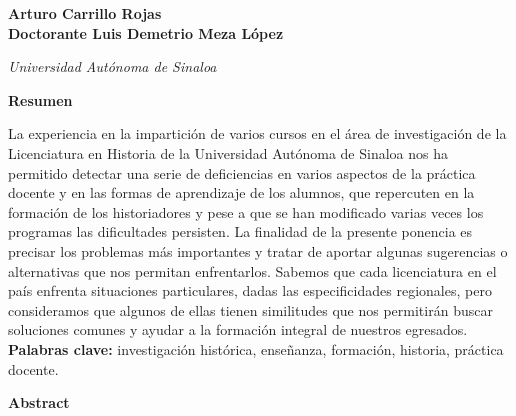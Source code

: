 %

\thispagestyle{empty}
{\par}
\setcounter{footnote}{0}


\bigskip
\begin{center}
{\bfseries Arturo Carrillo Rojas \\
Doctorante Luis Demetrio Meza López}\\
{\itshape Universidad Autónoma de Sinaloa \par}
\end{center}

\bigskip
{\bfseries Resumen}

La experiencia en la impartición de varios cursos en el área de 
investigación de la Licenciatura en Historia de la Universidad Autónoma 
de Sinaloa nos ha permitido detectar una serie de deficiencias en 
varios aspectos de la práctica docente y en las formas de aprendizaje 
de los alumnos, que repercuten en la formación de los historiadores y 
pese a que se han modificado varias veces los programas las 
dificultades persisten. La finalidad de la presente ponencia es 
precisar los problemas más importantes y tratar de aportar algunas 
sugerencias o alternativas que nos permitan enfrentarlos. Sabemos que 
cada licenciatura en el país enfrenta situaciones particulares, dadas 
las especificidades regionales, pero consideramos que algunos de ellas 
tienen similitudes que nos permitirán buscar soluciones comunes y 
ayudar a la formación integral de nuestros egresados.\\ 
\textbf{Palabras clave:} investigación histórica, enseñanza, formación,\linebreak 
historia, práctica docente.


\bigskip
{\bfseries Abstract}
\enlargethispage{1\baselineskip}

